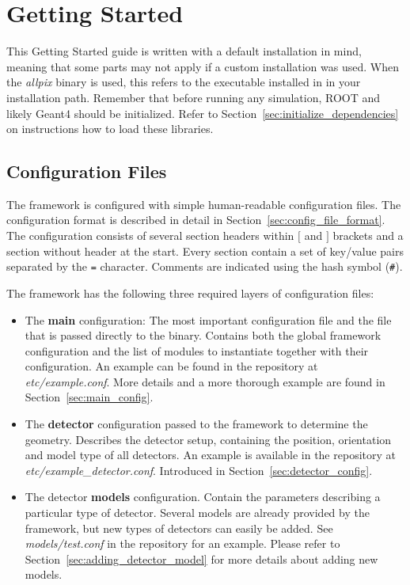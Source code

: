 \section{Getting Started}

This Getting Started guide is written with a default installation in mind, meaning that some parts may not apply if a custom installation was used.
When the \textit{allpix} binary is used, this refers to the executable installed in  in your installation path.
Remember that before running any \apsq simulation, ROOT and likely Geant4 should be initialized.
Refer to Section~\ref{sec:initialize_dependencies} on instructions how to load these libraries.

\subsection{Configuration Files}
\label{sec:configuration_files}
The framework is configured with simple human-readable configuration files.
The configuration format is described in detail in Section~\ref{sec:config_file_format}.
The configuration consists of several section headers within $[$ and $]$ brackets and a section without header at the start.
Every section contain a set of key/value pairs separated by the \texttt{=} character.
Comments are indicated using the hash symbol (\texttt{\#}).

The framework has the following three required layers of configuration files:
\begin{itemize}
\item The \textbf{main} configuration: The most important configuration file and the file that is passed directly to the binary.
Contains both the global framework configuration and the list of modules to instantiate together with their configuration.
An example can be found in the repository at \textit{etc/example.conf}.
More details and a more thorough example are found in Section~\ref{sec:main_config}.
\item The \textbf{detector} configuration passed to the framework to determine the geometry.
Describes the detector setup, containing the position, orientation and model type of all detectors.
An example is available in the repository at \textit{etc/example\_detector.conf}.
Introduced in Section~\ref{sec:detector_config}.
\item The detector \textbf{models} configuration.
Contain the parameters describing a particular type of detector.
Several models are already provided by the framework, but new types of detectors can easily be added.
See \textit{models/test.conf} in the repository for an example.
Please refer to Section~\ref{sec:adding_detector_model} for more details about adding new models.
\end{itemize}

